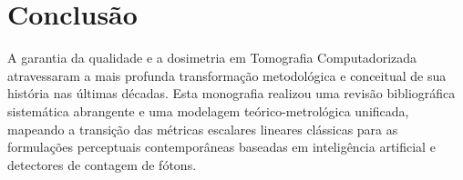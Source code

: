 \documentclass[
  12pt,
  a4paper,
  oneside
]{report}
\begin{document}
\chapter{Conclusão}
\label{chap:conclusao}

A garantia da qualidade e a dosimetria em Tomografia Computadorizada atravessaram a mais profunda transformação metodológica e conceitual de sua história nas últimas décadas. Esta monografia realizou uma revisão bibliográfica sistemática abrangente e uma modelagem teórico-metrológica unificada, mapeando a transição das métricas escalares lineares clássicas para as formulações perceptuais contemporâneas baseadas em inteligência artificial e detectores de contagem de fótons.
\end{document}
